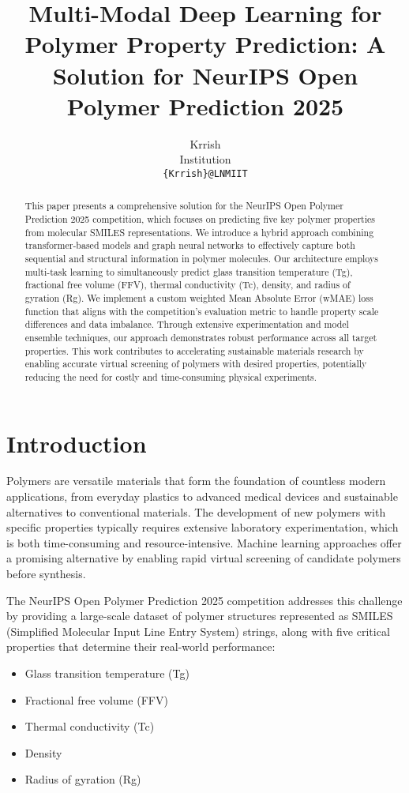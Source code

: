 \documentclass[10pt,twocolumn,letterpaper]{article}
\title{Multi-Modal Deep Learning for Polymer Property Prediction: A Solution for NeurIPS Open Polymer Prediction 2025}
\author{Krrish\\
Institution\\
\texttt{\{Krrish\}@LNMIIT}
}
\begin{document}
\maketitle

\begin{abstract}
This paper presents a comprehensive solution for the NeurIPS Open Polymer Prediction 2025 competition, which focuses on predicting five key polymer properties from molecular SMILES representations. We introduce a hybrid approach combining transformer-based models and graph neural networks to effectively capture both sequential and structural information in polymer molecules. Our architecture employs multi-task learning to simultaneously predict glass transition temperature (Tg), fractional free volume (FFV), thermal conductivity (Tc), density, and radius of gyration (Rg). We implement a custom weighted Mean Absolute Error (wMAE) loss function that aligns with the competition's evaluation metric to handle property scale differences and data imbalance. Through extensive experimentation and model ensemble techniques, our approach demonstrates robust performance across all target properties. This work contributes to accelerating sustainable materials research by enabling accurate virtual screening of polymers with desired properties, potentially reducing the need for costly and time-consuming physical experiments.
\end{abstract}

\section{Introduction}

Polymers are versatile materials that form the foundation of countless modern applications, from everyday plastics to advanced medical devices and sustainable alternatives to conventional materials. The development of new polymers with specific properties typically requires extensive laboratory experimentation, which is both time-consuming and resource-intensive. Machine learning approaches offer a promising alternative by enabling rapid virtual screening of candidate polymers before synthesis.

The NeurIPS Open Polymer Prediction 2025 competition addresses this challenge by providing a large-scale dataset of polymer structures represented as SMILES (Simplified Molecular Input Line Entry System) strings, along with five critical properties that determine their real-world performance:
\begin{itemize}
    \item Glass transition temperature (Tg)
    \item Fractional free volume (FFV)
    \item Thermal conductivity (Tc)
    \item Density
    \item Radius of gyration (Rg)
\end{itemize}
\end{document}
